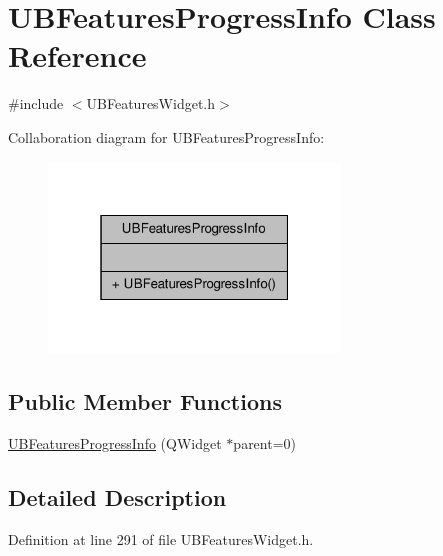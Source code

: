 \hypertarget{class_u_b_features_progress_info}{\section{U\-B\-Features\-Progress\-Info Class Reference}
\label{d0/d2e/class_u_b_features_progress_info}
}


{\ttfamily \#include $<$U\-B\-Features\-Widget.\-h$>$}



Collaboration diagram for U\-B\-Features\-Progress\-Info\-:
\nopagebreak
\begin{figure}[H]
\begin{center}
\leavevmode
\includegraphics[width=220pt]{d3/d95/class_u_b_features_progress_info__coll__graph}
\end{center}
\end{figure}
\subsection*{Public Member Functions}
\begin{DoxyCompactItemize}
\item 
\hyperlink{class_u_b_features_progress_info_a1eabf8468a3b06ecc1c3c8ae5ff546d1}{U\-B\-Features\-Progress\-Info} (Q\-Widget $\ast$parent=0)
\end{DoxyCompactItemize}


\subsection{Detailed Description}


Definition at line 291 of file U\-B\-Features\-Widget.\-h.



